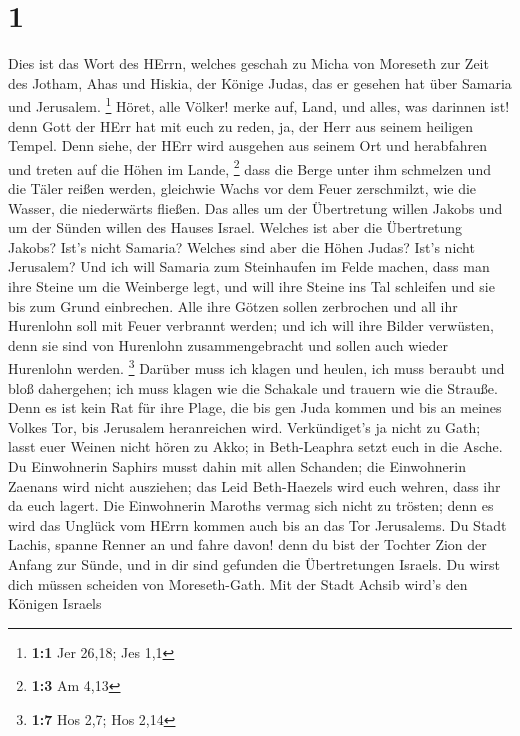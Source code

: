 \hypertarget{section}{%
\section{1}\label{section}}

 Dies ist das Wort des HErrn, welches geschah zu Micha von
Moreseth zur Zeit des Jotham, Ahas und Hiskia, der Könige Judas, das er
gesehen hat über Samaria und Jerusalem. \footnote{\textbf{1:1} Jer
  26,18; Jes 1,1}  Höret, alle Völker! merke auf, Land, und
alles, was darinnen ist! denn Gott der HErr hat mit euch zu reden, ja,
der Herr aus seinem heiligen Tempel.  Denn siehe, der HErr
wird ausgehen aus seinem Ort und herabfahren und treten auf die Höhen im
Lande, \footnote{\textbf{1:3} Am 4,13}  dass die Berge unter
ihm schmelzen und die Täler reißen werden, gleichwie Wachs vor dem Feuer
zerschmilzt, wie die Wasser, die niederwärts fließen.  Das
alles um der Übertretung willen Jakobs und um der Sünden willen des
Hauses Israel. Welches ist aber die Übertretung Jakobs? Ist's nicht
Samaria? Welches sind aber die Höhen Judas? Ist's nicht Jerusalem?
 Und ich will Samaria zum Steinhaufen im Felde machen, dass
man ihre Steine um die Weinberge legt, und will ihre Steine ins Tal
schleifen und sie bis zum Grund einbrechen.  Alle ihre
Götzen sollen zerbrochen und all ihr Hurenlohn soll mit Feuer verbrannt
werden; und ich will ihre Bilder verwüsten, denn sie sind von Hurenlohn
zusammengebracht und sollen auch wieder Hurenlohn werden. \footnote{\textbf{1:7}
  Hos 2,7; Hos 2,14}  Darüber muss ich klagen und heulen,
ich muss beraubt und bloß dahergehen; ich muss klagen wie die Schakale
und trauern wie die Strauße.  Denn es ist kein Rat für ihre
Plage, die bis gen Juda kommen und bis an meines Volkes Tor, bis
Jerusalem heranreichen wird.  Verkündiget's ja nicht zu
Gath; lasst euer Weinen nicht hören zu Akko; in Beth-Leaphra setzt euch
in die Asche.  Du Einwohnerin Saphirs musst dahin mit allen
Schanden; die Einwohnerin Zaenans wird nicht ausziehen; das Leid
Beth-Haezels wird euch wehren, dass ihr da euch lagert. 
Die Einwohnerin Maroths vermag sich nicht zu trösten; denn es wird das
Unglück vom HErrn kommen auch bis an das Tor Jerusalems. 
Du Stadt Lachis, spanne Renner an und fahre davon! denn du bist der
Tochter Zion der Anfang zur Sünde, und in dir sind gefunden die
Übertretungen Israels.  Du wirst dich müssen scheiden von
Moreseth-Gath. Mit der Stadt Achsib wird's den Königen Israels
